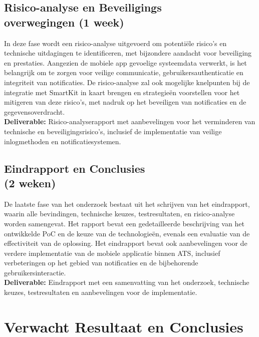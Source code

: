 \subsection{Risico-analyse en Beveiligings\\overwegingen (1 week)}
\noindent In deze fase wordt een risico-analyse uitgevoerd om potentiële risico’s en technische uitdagingen te identificeren, met bijzondere aandacht voor beveiliging en prestaties. Aangezien de mobiele app gevoelige systeemdata verwerkt, is het belangrijk om te zorgen voor veilige communicatie, gebruikersauthenticatie en integriteit van notificaties. De risico-analyse zal ook mogelijke knelpunten bij de integratie met SmartKit in kaart brengen en strategieën voorstellen voor het mitigeren van deze risico’s, met nadruk op het beveiligen van notificaties en de gegevensoverdracht. \\

\noindent \textbf{Deliverable:} Risico-analyserapport met aanbevelingen voor het verminderen van technische en beveiligingsrisico’s, inclusief de implementatie van veilige inlogmethoden en notificatiesystemen.

\subsection{Eindrapport en Conclusies \\(2 weken)}
\noindent De laatste fase van het onderzoek bestaat uit het schrijven van het eindrapport, waarin alle bevindingen, technische keuzes, testresultaten, en risico-analyse worden samengevat. Het rapport bevat een gedetailleerde beschrijving van het ontwikkelde PoC en de keuze van de technologieën, evenals een evaluatie van de effectiviteit van de oplossing. Het eindrapport bevat ook aanbevelingen voor de verdere implementatie van de mobiele applicatie binnen ATS, inclusief verbeteringen op het gebied van notificaties en de bijbehorende gebruikersinteractie. \\

\noindent \textbf{Deliverable:} Eindrapport met een samenvatting van het onderzoek, technische keuzes, testresultaten en aanbevelingen voor de implementatie.



\section{Verwacht Resultaat en Conclusies}
\label{sec:verwachte_resultaten}

